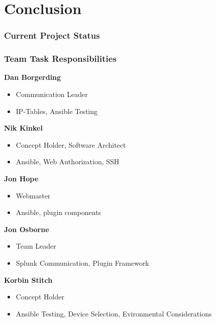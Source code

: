 \section{Conclusion}

\begin{frame}
\frametitle{Current Project Status}


\end{frame}

\begin{frame}
\frametitle{Team Task Responsibilities}


\textbf{Dan Borgerding}
\begin{itemize}
\item Communication Leader
\item IP-Tables, Ansible Testing\end{itemize}

\textbf{Nik Kinkel}
\begin{itemize}
\item Concept Holder, Software Architect
\item Ansible, Web Authorization, SSH \end{itemize}


\textbf{Jon Hope}
\begin{itemize}
\item Webmaster
\item Ansible, plugin components
\end{itemize}

\textbf{Jon Osborne}
\begin{itemize}
\item Team Leader
\item Splunk Communication, Plugin Framework
\end{itemize}

\textbf{Korbin Stitch}
\begin{itemize}
\item Concept Holder
\item  Ansible Testing, Device Selection, Evironmental Considerations
\end{itemize}

\end{frame}


